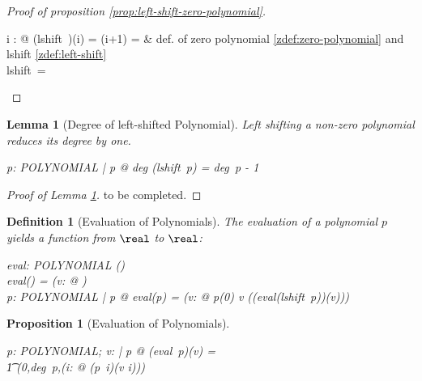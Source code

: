\documentclass[12pt]{scrartcl}
\newtheorem{prop}{Proposition}[section]
\newtheorem{lemma}{Lemma}[section]
\newtheorem{zdef}{Definition}[section]
\begin{document}
\begin{proof}[Proof of proposition
  \ref{prop:left-shift-zero-polynomial}]
  \begin{argue}
    \forall i : \nat @ (lshift~\zeropol)(i) = \zeropol(i+1) = \azero &
    def. of zero polynomial  \ref{zdef:zero-polynomial} and
    lshift \ref{zdef:left-shift}\\
    \vdash lshift~\zeropol = \zeropol \\
  \end{argue}
  
\end{proof}
\begin{lemma}[Degree of left-shifted Polynomial]
  \label{lemma:degree-left-shift}
  Left shifting a non-zero polynomial reduces its degree by one.
  \begin{zed}
    \forall p: POLYNOMIAL | p \neq \zeropol @ deg (lshift~p) = deg~p - 1
  \end{zed}
\end{lemma}

\begin{proof}[Proof of Lemma \ref{lemma:degree-left-shift}]
  to be completed.
\end{proof}

\begin{zdef}[Evaluation of Polynomials]
  \label{zdef:evaluation}
  The evaluation of a polynomial $p$ yields a function from $\real$ to
  $\real$:
  \begin{axdef}
    eval: POLYNOMIAL \fun (\real \fun \real)\\
    \where
    eval(\zeropol) = (\lambda v: \real @ \azero)\\
    \forall p: POLYNOMIAL | p \neq \zeropol @ eval(p) = (\lambda v:
    \real @ p(0) \aplus v \amult ((eval(lshift~p))(v)))
  \end{axdef}
\end{zdef}


\begin{prop}[Evaluation of Polynomials]
  \label{prop:evalutation}
  \begin{zed}
    \forall p: POLYNOMIAL; v: \real | p \neq \zeropol @ (eval~p)(v) = \\
    \t1 \finsum(0,deg~p,(\lambda i: \nat @ (p~i)\amult(v \apwr i)))
  \end{zed}
\end{prop}
\end{document}
